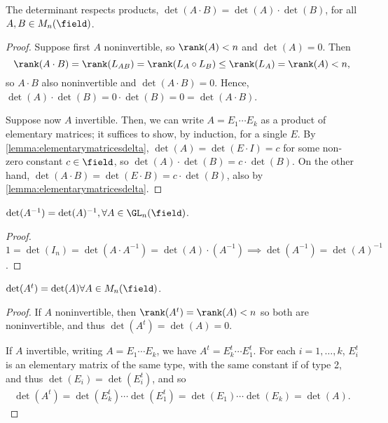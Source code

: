 \begin{theorem}
    The determinant respects products, $\det(A \cdot B) = \det(A) \cdot \det(B)$, for all $A, B \in M_n(\field)$.
\end{theorem}
\begin{proof}
    Suppose first $A$ noninvertible, so $\rank(A) < n$ and $\det(A)  = 0$. Then \[
    \rank(A \cdot B) = \rank(L_{AB}) = \rank(L_A \circ L_B) \leq \rank(L_A) = \rank(A) < n,
    \]
    so $A \cdot B$ also noninvertible and $\det(A \cdot B) = 0$. Hence, $\det(A) \cdot \det(B) = 0 \cdot \det(B) = 0 = \det(A \cdot B)$.

    Suppose now $A$ invertible. Then, we can write $A = E_1 \cdots E_k$ as a product of elementary matrices; it suffices to show, by induction, for a single $E$. By \cref{lemma:elementarymatricesdelta}, $\det(A) = \det(E \cdot I) = c$ for some non-zero constant $c \in \field$, so $\det(A) \cdot \det(B) = c \cdot \det(B)$. On the other hand, $\det(A \cdot B) = \det(E \cdot B) = c \cdot \det(B)$, also by \cref{lemma:elementarymatricesdelta}.
\end{proof}
\begin{corollary}
    $\det(A^{-1}) = \det(A)^{-1}, \forall A \in \GL_n(\field)$.
\end{corollary}
\begin{proof}
    $1 = \det(I_n) = \det(A \cdot A^{-1}) = \det(A) \cdot (A^{-1}) \implies \det(A^{-1}) = \det(A)^{-1}$.
\end{proof}
\begin{corollary}
    $\det(A^t) = \det(A) \forall A \in M_n(\field)$.
\end{corollary}
\begin{proof}
    If $A$ noninvertible, then $\rank(A^t) = \rank(A) < n$ so both are noninvertible, and thus $\det(A^t) = \det(A) = 0$.

    If $A$ invertible, writing $A = E_{1} \cdots E_k$, we have $A^t = E_k^t \cdots E_1^t$. For each $i = 1, \dots, k$, $E_i^t$ is an elementary matrix of the same type, with the same constant if of type 2, and thus $\det(E_i) = \det(E_i^t)$, and so \begin{align*}
        \det(A^t) = \det(E_k^t) \cdots \det(E_1^t) = \det(E_1) \cdots \det(E_k) = \det(A).
    \end{align*}
\end{proof}